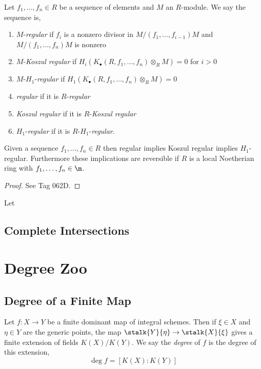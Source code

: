 \documentclass[12pt]{article}
\begin{document}
\begin{defn}
Let $f_1, \dots, f_n \in R$ be a sequence of elements and $M$ an $R$-module. We say the sequence is,
\begin{center}
\begin{enumerate}
\item $M$-\textit{regular} if $f_i$ is a nonzero divisor in $M/(f_1, \dots, f_{i-1})M$ and $M/(f_1, \dots, f_n) M$ is nonzero
\item $M$-\textit{Koszul regular} if $H_i(K_\bullet(R, f_1, \dots, f_n) \otimes_R M) = 0$ for $i > 0$
\item $M$-$H_1$-\textit{regular} if $H_1(K_\bullet(R, f_1, \dots, f_n) \otimes_R M) = 0$
\item \textit{regular} if it is $R$-\textit{regular}
\item \textit{Koszul regular} if it is $R$-\textit{Koszul regular}
\item $H_1$-\textit{regular} if it is $R$-$H_1$-\textit{regular}.
\end{enumerate}
\end{center}
\end{defn}

\begin{lemma}
Given a sequence $f_1, \dots, f_n \in R$ then regular implies Koszul regular implies $H_1$-regular. Furthermore these implications are reversible if $R$ is a local Noetherian ring with $f_1, \dots, f_n \in \m$.
\end{lemma}

\begin{proof}
See Tag 062D.
\end{proof}

\begin{lemma}
Let 
\end{lemma}

\subsection{Complete Intersections}

\section{Degree Zoo}

\subsection{Degree of a Finite Map}

\begin{defn}
Let $f : X \to Y$ be a finite dominant map of integral schemes. Then if $\xi \in X$ and $\eta \in Y$ are the generic points, the map $\stalk{Y}{\eta} \to \stalk{X}{\xi}$ gives a finite extension of fields $K(X) / K(Y)$. We say the \textit{degree} of $f$ is the degree of this extension,
\[ \deg{f} = [K(X) : K(Y)] \]
\end{defn}
\end{document}

